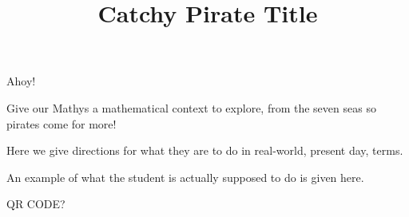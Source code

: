 \documentclass{article}
\title{Catchy Pirate Title}
\begin{document}
\begin{context}
  Ahoy!

  
  Give our Mathys a mathematical context to explore, from the seven
  seas  so pirates come for more!
\end{context}

\begin{directions}
  Here we give directions for what they are to do in real-world,
  present day, terms.
\end{directions}


\begin{example}
  An example of what the student is actually supposed to do is given
  here.
\end{example}


\begin{mathConnections}
  QR CODE?
\end{mathConnections}
\end{document}
